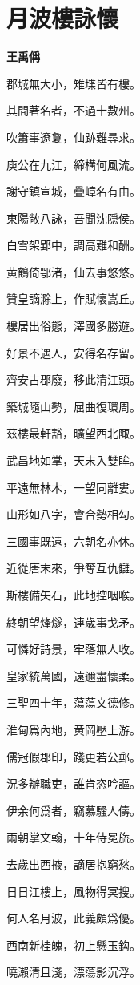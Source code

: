 \documentclass[12pt,a4paper]{ctexbook}
\begin{document}
\section{月波樓詠懷}
\textbf{王禹偁}\par\vspace{0.5em}
郡城無大小，雉堞皆有樓。\par
其間著名者，不過十數州。\par
吹簫事遼夐，仙跡難尋求。\par
庾公在九江，締構何風流。\par
謝守鎮宣城，疊嶂名有由。\par
東陽敞八詠，吾聞沈隠侯。\par
白雪架郢中，調高難和酬。\par
黄鶴倚鄂渚，仙去事悠悠。\par
贊皇謫滁上，作賦懷嵩丘。\par
樓居出俗態，澤國多勝遊。\par
好景不遇人，安得名存留。\par
齊安古郡廢，移此清江頭。\par
築城隨山勢，屈曲復環周。\par
茲樓最軒豁，曠望西北陬。\par
武昌地如掌，天末入雙眸。\par
平遠無林木，一望同離婁。\par
山形如八字，會合勢相勾。\par
三國事既遠，六朝名亦休。\par
近從唐末來，爭奪互仇讎。\par
斯樓備矢石，此地控咽喉。\par
終朝望烽燧，連歲事戈矛。\par
可憐好詩景，牢落無人收。\par
皇家統萬國，遠邇盡懷柔。\par
三聖四十年，蕩蕩文德修。\par
淮甸爲內地，黄岡壓上游。\par
儒冠假郡印，踐更若公郵。\par
況多辦職吏，誰肯恣吟謳。\par
伊余何爲者，竊慕騷人儔。\par
兩朝掌文翰，十年侍冕旒。\par
去歲出西掖，謫居抱窮愁。\par
日日江樓上，風物得冥搜。\par
何人名月波，此義頗爲優。\par
西南新桂魄，初上懸玉鈎。\par
曉瀨清且淺，漂蕩影沉浮。\par
\end{document}
